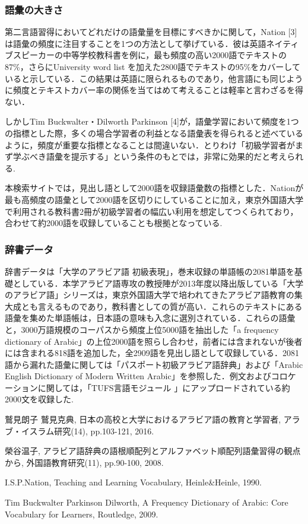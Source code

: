 \documentclass[technicalreport]{ieicej}
\begin{document}
\subsubsection{語彙の大きさ}
第二言語習得においてどれだけの語彙量を目標にすべきかに関して，Nation [3]は語彙の頻度に注目することを1つの方法として挙げている．彼は英語ネイティブスピーカーの中等学校教科書を例に，最も頻度の高い2000語でテキストの87\%，さらにUniversity word list を加えた2800語でテキストの95\%をカバーしていると示している．この結果は英語に限られるものであり，他言語にも同じように頻度とテキストカバー率の関係を当てはめて考えることは軽率と言わざるを得ない．

しかしTim Buckwalter・Dilworth Parkinson [4]が，語彙学習において頻度を1つの指標とした際，多くの場合学習者の利益となる語彙表を得られると述べているように，頻度が重要な指標となることは間違いない．とりわけ「初級学習者がまず学ぶべき語彙を提示する」という条件のもとでは，非常に効果的だと考えられる.

本検索サイトでは，見出し語として2000語を収録語彙数の指標とした．Nationが最も高頻度の語彙として2000語を区切りにしていることに加え，東京外国語大学で利用される教科書2冊が初級学習者の幅広い利用を想定してつくられており，合わせて約2000語を収録していることも根拠となっている.

\subsubsection{辞書データ}
辞書データは「大学のアラビア語 初級表現」，巻末収録の単語帳の2081単語を基礎としている．本学アラビア語専攻の教授陣が2013年度以降出版している「大学のアラビア語」シリーズは，東京外国語大学で培われてきたアラビア語教育の集大成とも言えるものであり，教科書としての質が高い．これらのテキストにある語彙を集めた単語帳は，日本語の意味も入念に選別されている．これらの語彙と，3000万語規模のコーパスから頻度上位5000語を抽出した「a frequency dictionary of Arabic」の上位2000語を照らし合わせ，前者には含まれないが後者には含まれる818語を追加した，全2909語を見出し語として収録している．2081語から漏れた語彙に関しては「パスポート初級アラビア語辞典」および「Arabic English Dictionary of Modern Written Arabic」を参照した．例文およびコロケーションに関しては，「TUFS言語モジュール 」にアップロードされている約2000文を収録した.

\begin{thebibliography}{99}
鷲見朗子 鷲見克典, 日本の高校と大学におけるアラビア語の教育と学習者, アラブ・イスラム研究(14), pp.103-121, 2016.

榮谷温子, アラビア語辞典の語根順配列とアルファベット順配列語彙習得の観点から, 外国語教育研究(11), pp.90-100, 2008.

I.S.P.Nation, Teaching and Learning Vocabulary, Heinle\&Heinle, 1990. 

Tim Buckwalter  Parkinson Dilworth, A Frequency Dictionary of Arabic: Core Vocabulary for Learners, Routledge, 2009.

\end{thebibliography}
\end{document}
